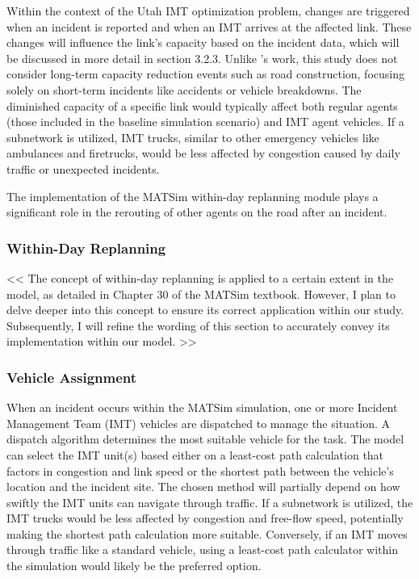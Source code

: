 \documentclass[
  letterpaper,
  authoryear]{elsarticle}
\begin{document}
Within the context of the Utah IMT optimization problem, changes are
triggered when an incident is reported and when an IMT arrives at the
affected link. These changes will influence the link's capacity based on
the incident data, which will be discussed in more detail in section
3.2.3. Unlike \citet{kaddoura2018} 's work, this study does not consider
long-term capacity reduction events such as road construction, focusing
solely on short-term incidents like accidents or vehicle breakdowns. The
diminished capacity of a specific link would typically affect both
regular agents (those included in the baseline simulation scenario) and
IMT agent vehicles. If a subnetwork is utilized, IMT trucks, similar to
other emergency vehicles like ambulances and firetrucks, would be less
affected by congestion caused by daily traffic or unexpected incidents.

The implementation of the MATSim within-day replanning module plays a
significant role in the rerouting of other agents on the road after an
incident.

\hypertarget{within-day-replanning}{%
\subsubsection{Within-Day Replanning}\label{within-day-replanning}}

\textless\textless{} The concept of within-day replanning is applied to
a certain extent in the model, as detailed in Chapter 30 of the MATSim
textbook. However, I plan to delve deeper into this concept to ensure
its correct application within our study. Subsequently, I will refine
the wording of this section to accurately convey its implementation
within our model. \textgreater\textgreater{}

\hypertarget{vehicle-assignment}{%
\subsubsection{Vehicle Assignment}\label{vehicle-assignment}}

When an incident occurs within the MATSim simulation, one or more
Incident Management Team (IMT) vehicles are dispatched to manage the
situation. A dispatch algorithm determines the most suitable vehicle for
the task. The model can select the IMT unit(s) based either on a
least-cost path calculation that factors in congestion and link speed or
the shortest path between the vehicle's location and the incident site.
The chosen method will partially depend on how swiftly the IMT units can
navigate through traffic. If a subnetwork is utilized, the IMT trucks
would be less affected by congestion and free-flow speed, potentially
making the shortest path calculation more suitable. Conversely, if an
IMT moves through traffic like a standard vehicle, using a least-cost
path calculator within the simulation would likely be the preferred
option.
\end{document}
